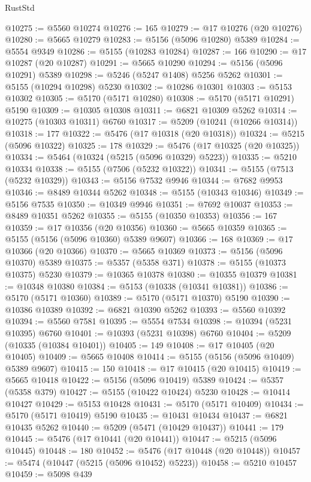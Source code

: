 \begin{lexlean}{RustStd}
\begin{coremodule}
@10275 := @5560 @10274
@10276 := 165
@10279 := @17 @10276 (@20 @10276)
@10280 := @5665 @10279
@10283 := @5156 (@5096 @10280) @5389
@10284 := @5554 @9349
@10286 := @5155 (@10283 @10284)
@10287 := 166
@10290 := @17 @10287 (@20 @10287)
@10291 := @5665 @10290
@10294 := @5156 (@5096 @10291) @5389
@10298 := @5246 (@5247 @1408) @5256 @5262
@10301 := @5155 (@10294 @10298) @5230
@10302 := @10286 @10301
@10303 := @5153 @10302
@10305 := @5170 (@5171 @10280)
@10308 := @5170 (@5171 @10291) @5190
@10309 := @10305 @10308
@10311 := @6821 @10309 @5262
@10314 := @10275 (@10303 @10311) @6760
@10317 := @5209 (@10241 (@10266 @10314))
@10318 := 177
@10322 := @5476 (@17 @10318 (@20 @10318))
@10324 := @5215 (@5096 @10322)
@10325 := 178
@10329 := @5476 (@17 @10325 (@20 @10325))
@10334 := @5464 (@10324 (@5215 (@5096 @10329) @5223))
@10335 := @5210 @10334
@10338 := @5155 (@7506 (@5232 @10322))
@10341 := @5155 (@7513 (@5232 @10329))
@10343 := @5156 @7532 @9946
@10344 := @7682 @9953
@10346 := @8489 @10344 @5262
@10348 := @5155 (@10343 @10346)
@10349 := @5156 @7535
@10350 := @10349 @9946
@10351 := @7692 @10037
@10353 := @8489 @10351 @5262
@10355 := @5155 (@10350 @10353)
@10356 := 167
@10359 := @17 @10356 (@20 @10356)
@10360 := @5665 @10359
@10365 := @5155 (@5156 (@5096 @10360) @5389 @9607)
@10366 := 168
@10369 := @17 @10366 (@20 @10366)
@10370 := @5665 @10369
@10373 := @5156 (@5096 @10370) @5389
@10375 := @5357 (@5358 @371)
@10378 := @5155 (@10373 @10375) @5230
@10379 := @10365 @10378
@10380 := @10355 @10379
@10381 := @10348 @10380
@10384 := @5153 (@10338 (@10341 @10381))
@10386 := @5170 (@5171 @10360)
@10389 := @5170 (@5171 @10370) @5190
@10390 := @10386 @10389
@10392 := @6821 @10390 @5262
@10393 := @5560 @10392
@10394 := @5560 @7581
@10395 := @5554 @7534
@10398 := @10394 (@5231 @10395) @6760
@10401 := @10393 (@5231 @10398) @6760
@10404 := @5209 (@10335 (@10384 @10401))
@10405 := 149
@10408 := @17 @10405 (@20 @10405)
@10409 := @5665 @10408
@10414 := @5155 (@5156 (@5096 @10409) @5389 @9607)
@10415 := 150
@10418 := @17 @10415 (@20 @10415)
@10419 := @5665 @10418
@10422 := @5156 (@5096 @10419) @5389
@10424 := @5357 (@5358 @379)
@10427 := @5155 (@10422 @10424) @5230
@10428 := @10414 @10427
@10429 := @5153 @10428
@10431 := @5170 (@5171 @10409)
@10434 := @5170 (@5171 @10419) @5190
@10435 := @10431 @10434
@10437 := @6821 @10435 @5262
@10440 := @5209 (@5471 (@10429 @10437))
@10441 := 179
@10445 := @5476 (@17 @10441 (@20 @10441))
@10447 := @5215 (@5096 @10445)
@10448 := 180
@10452 := @5476 (@17 @10448 (@20 @10448))
@10457 := @5474 (@10447 (@5215 (@5096 @10452) @5223))
@10458 := @5210 @10457
@10459 := @5098 @439

\end{coremodule}
\end{lexlean}
